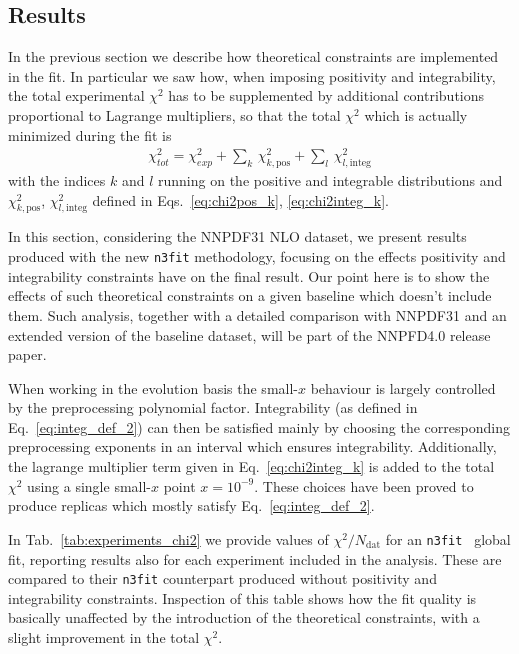 \subsection{Results}
In the previous section we describe how theoretical constraints are implemented in the fit.
In particular we saw how, when imposing positivity and integrability,
the total experimental $\chi^2$ has to be supplemented by additional contributions
proportional to Lagrange multipliers, so that the total $\chi^2$ which is actually minimized
during the fit is 
\begin{align}
	\label{eq:chi2pos_integ}
	\chi^2_{tot} = \chi^2_{exp} + \sum_k\, \chi^2_{k,\text{pos}} + \sum_l\, \chi^2_{l,\text{integ}}
\end{align}
with the indices $k$ and $l$ running on the positive and integrable distributions
and $\chi^2_{k,\text{pos}}$, $\chi^2_{l,\text{integ}}$ defined in Eqs.~\eqref{eq:chi2pos_k}, \eqref{eq:chi2integ_k}.

%
In this section, considering the NNPDF31 NLO dataset, we present results produced with the new {\tt n3fit} methodology,
focusing on the effects positivity and integrability constraints have on the final result.
Our point here is to show the effects of such theoretical constraints on a given baseline which doesn't 
include them.
Such analysis, together with a detailed comparison with NNPDF31 and an extended version
of the baseline dataset, will be part of the NNPFD4.0 release paper.

%
When working in the evolution basis the small-$x$ behaviour is largely controlled by the preprocessing
polynomial factor. Integrability (as defined in Eq.~\eqref{eq:integ_def_2})
can then be satisfied mainly by choosing the corresponding preprocessing exponents in an interval which ensures integrability.
Additionally, the lagrange multiplier term given in Eq.~\eqref{eq:chi2integ_k} is added to the
total $\chi^2$ using a single small-$x$ point $x=10^{-9}$. These choices have been proved to
produce replicas which mostly satisfy Eq.~\eqref{eq:integ_def_2}. 

%
In Tab.~\ref{tab:experiments_chi2} we provide values of $\chi^2/N_{\text{dat}}$ for an {\tt n3fit } global fit,
reporting results also for each experiment included in the analysis.
These are compared to their {\tt n3fit} counterpart produced without positivity and integrability constraints. 
Inspection of this table shows how the fit quality is basically unaffected by the introduction of the
theoretical constraints, with a slight improvement in the total $\chi^2$.
 
